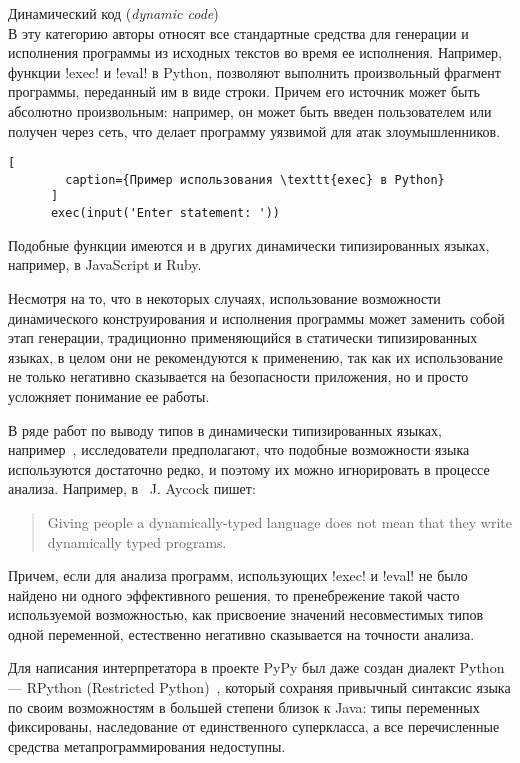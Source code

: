 \begin{description}
  \item Динамический код (\emph{dynamic code}) \\ \hfill
      В эту категорию авторы относят все стандартные средства для генерации и
      исполнения программы из исходных текстов во время ее исполнения.
      Например, функции !exec! и !eval! в Python, позволяют выполнить
      произвольный фрагмент программы, переданный им в виде строки.  Причем его
      источник может быть абсолютно произвольным: например, он может быть введен
      пользователем или получен через сеть, что делает программу уязвимой для
      атак злоумышленников.

      \begin{lstlisting}[
        caption={Пример использования \texttt{exec} в Python}
      ]
      exec(input('Enter statement: '))  
      \end{lstlisting}

      Подобные функции имеются и в других динамически типизированных языках,
      например, в JavaScript и Ruby.

      Несмотря на то, что в некоторых случаях, использование возможности
      динамического конструирования и исполнения программы может заменить собой
      этап генерации, традиционно применяющийся в статически типизированных
      языках, в целом они не рекомендуются к применению, так как их
      использование не только негативно сказывается на безопасности приложения,
      но и просто усложняет понимание ее работы.

\end{description}

В ряде работ по выводу типов в динамически типизированных языках,
например~\cite{Salib2004,Aycock2000}, исследователи предполагают, что подобные
возможности языка используются достаточно редко, и поэтому их можно игнорировать
в процессе анализа.  Например, в~\cite{Aycock2000} J. Aycock пишет:

\begin{quote} Giving people a dynamically-typed language does not mean that they
  write dynamically typed programs. 
\end{quote}

Причем, если для анализа программ, использующих !exec! и !eval! не было найдено
ни одного эффективного решения, то пренебрежение такой часто используемой
возможностью, как присвоение значений несовместимых типов одной переменной,
естественно негативно сказывается на точности анализа. 

Для написания интерпретатора в проекте PyPy был даже создан диалект Python ---
RPython (Restricted Python)~\cite{Ancona2007}, который сохраняя привычный
синтаксис языка по своим возможностям в большей степени близок к Java: типы
переменных фиксированы, наследование от единственного суперкласса, а все
перечисленные средства метапрограммирования недоступны. 

